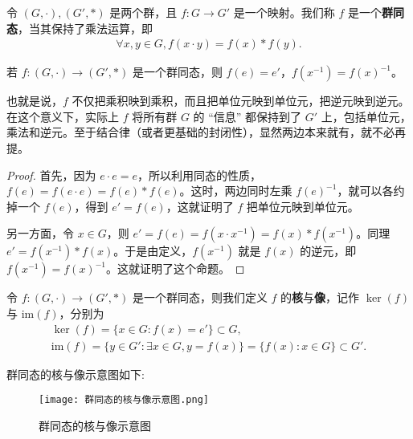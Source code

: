 \documentclass[../../main.tex]{subfiles}
\begin{document}
\begin{definition}[群同态]
令 $(G, \cdot), (G', *)$ 是两个群，且 $f : G \to G'$ 是一个映射。我们称 $f$ 是一个\textbf{群同态}，当其保持了乘法运算，即
\begin{align*}
\forall x, y \in G, f(x \cdot y) = f(x) * f(y).
\end{align*} 
\end{definition}

\begin{proposition}\label{proposition:群同态保持逆元和单位元}
若 $f : (G, \cdot) \to (G', *)$ 是一个群同态，则 $f(e) = e'$，$f(x^{-1}) = f(x)^{-1}$。
\end{proposition}
\begin{note}
也就是说，$f$ 不仅把乘积映到乘积，而且把单位元映到单位元，把逆元映到逆元。在这个意义下，实际上 $f$ 将所有群 $G$ 的 “信息” 都保持到了 $G'$ 上，包括单位元，乘法和逆元。至于结合律（或者更基础的封闭性），显然两边本来就有，就不必再提。
\end{note}
\begin{proof}
首先，因为 $e \cdot e = e$，所以利用同态的性质，$f(e) = f(e \cdot e) = f(e) * f(e)$。这时，两边同时左乘 $f(e)^{-1}$，就可以各约掉一个 $f(e)$，得到 $e' = f(e)$，这就证明了 $f$ 把单位元映到单位元。

另一方面，令 $x \in G$，则 $e' = f(e) = f(x \cdot x^{-1}) = f(x) * f(x^{-1})$。同理 $e' = f(x^{-1}) * f(x)$。于是由定义，$f(x^{-1})$ 就是 $f(x)$ 的逆元，即 $f(x^{-1}) = f(x)^{-1}$。这就证明了这个命题。 
\end{proof}

\begin{definition}[群同态的核与像]
令 $f : (G, \cdot) \to (G', *)$ 是一个群同态，则我们定义 $f$ 的\textbf{核}与\textbf{像}，记作 $\ker(f)$ 与 $\mathrm{im}(f)$，分别为
\begin{gather*}
\ker(f) = \{x \in G : f(x) = e'\} \subset G ,\\
\mathrm{im}(f) = \{y \in G' : \exists x \in G, y = f(x)\} = \{f(x) : x \in G\} \subset G'.
\end{gather*} 
\end{definition}
\begin{note}
群同态的核与像示意图如下:
\begin{figure}[H]
\centering
\texttt{[image: 群同态的核与像示意图.png]}
\label{figure:群同态的核与像示意图}
\caption{群同态的核与像示意图}
\end{figure}
\end{note}
\end{document}
